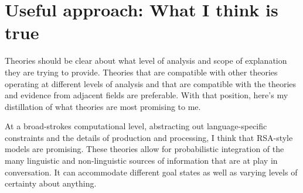 \documentclass[]{article}
\begin{document}
%
%
%
%
%






\section{Useful approach: What I think is true}
Theories should be clear about what level of analysis and scope of explanation they are trying to provide. Theories that are compatible with other theories operating at different levels of analysis and that are compatible with the theories and evidence from adjacent fields are preferable. With that position, here's my distillation of what theories are most promising to me. 

At a broad-strokes computational level, abstracting out language-specific constraints and the details of production and processing, I think that RSA-style models are promising. These theories allow for probabilistic integration of the many linguistic and non-linguistic sources of information that are at play in conversation. It can accommodate different goal states as well as varying levels of certainty about anything.
\end{document}
